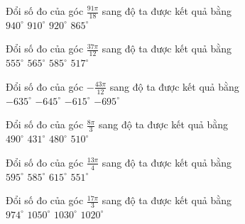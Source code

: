 \documentclass[12pt,a4paper]{article}
\begin{document}
\begin{ex}
 Đổi số đo của góc $\frac{91 \pi}{18}$ sang độ ta được kết quả bằng\\ 
\choice
{ $940^\circ$ }
   { \True $910^\circ$ }
     { $920^\circ$ }
    { $865^\circ$ }
\end{ex}

\begin{ex}
 Đổi số đo của góc $\frac{37 \pi}{12}$ sang độ ta được kết quả bằng\\ 
\choice
{ \True $555^\circ$ }
   { $565^\circ$ }
     { $585^\circ$ }
    { $517^\circ$ }
\end{ex}

\begin{ex}
 Đổi số đo của góc $- \frac{43 \pi}{12}$ sang độ ta được kết quả bằng\\ 
\choice
{ $-635^\circ$ }
   { \True $-645^\circ$ }
     { $-615^\circ$ }
    { $-695^\circ$ }
\end{ex}

\begin{ex}
 Đổi số đo của góc $\frac{8 \pi}{3}$ sang độ ta được kết quả bằng\\ 
\choice
{ $490^\circ$ }
   { $431^\circ$ }
     { \True $480^\circ$ }
    { $510^\circ$ }
\end{ex}

\begin{ex}
 Đổi số đo của góc $\frac{13 \pi}{4}$ sang độ ta được kết quả bằng\\ 
\choice
{ $595^\circ$ }
   { \True $585^\circ$ }
     { $615^\circ$ }
    { $551^\circ$ }
\end{ex}

\begin{ex}
 Đổi số đo của góc $\frac{17 \pi}{3}$ sang độ ta được kết quả bằng\\ 
\choice
{ $974^\circ$ }
   { $1050^\circ$ }
     { $1030^\circ$ }
    { \True $1020^\circ$ }
\end{ex}
\end{document}
